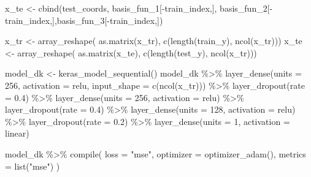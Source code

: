 \documentclass[
]{article}
\newenvironment{Shaded}{\begin{snugshade}}{\end{snugshade}}
\newcommand{\AttributeTok}[1]{\textcolor[rgb]{0.77,0.63,0.00}{#1}}
\newcommand{\DecValTok}[1]{\textcolor[rgb]{0.00,0.00,0.81}{#1}}
\newcommand{\FloatTok}[1]{\textcolor[rgb]{0.00,0.00,0.81}{#1}}
\newcommand{\FunctionTok}[1]{\textcolor[rgb]{0.00,0.00,0.00}{#1}}
\newcommand{\NormalTok}[1]{#1}
\newcommand{\OtherTok}[1]{\textcolor[rgb]{0.56,0.35,0.01}{#1}}
\newcommand{\SpecialCharTok}[1]{\textcolor[rgb]{0.00,0.00,0.00}{#1}}
\newcommand{\StringTok}[1]{\textcolor[rgb]{0.31,0.60,0.02}{#1}}
\begin{document}
\begin{Shaded}
\begin{Highlighting}[]
\NormalTok{  x\_te }\OtherTok{\textless{}{-}} \FunctionTok{cbind}\NormalTok{(test\_coords, basis\_fun\_1[}\SpecialCharTok{{-}}\NormalTok{train\_index,],}
\NormalTok{                basis\_fun\_2[}\SpecialCharTok{{-}}\NormalTok{train\_index,],basis\_fun\_3[}\SpecialCharTok{{-}}\NormalTok{train\_index,]) }
  
  
\NormalTok{  x\_tr }\OtherTok{\textless{}{-}} \FunctionTok{array\_reshape}\NormalTok{( }\FunctionTok{as.matrix}\NormalTok{(x\_tr), }\FunctionTok{c}\NormalTok{(}\FunctionTok{length}\NormalTok{(train\_y), }\FunctionTok{ncol}\NormalTok{(x\_tr)))}
\NormalTok{  x\_te }\OtherTok{\textless{}{-}} \FunctionTok{array\_reshape}\NormalTok{( }\FunctionTok{as.matrix}\NormalTok{(x\_te), }\FunctionTok{c}\NormalTok{(}\FunctionTok{length}\NormalTok{(test\_y), }\FunctionTok{ncol}\NormalTok{(x\_tr))) }
  
  
  
\NormalTok{model\_dk }\OtherTok{\textless{}{-}} \FunctionTok{keras\_model\_sequential}\NormalTok{()}
\NormalTok{model\_dk }\SpecialCharTok{\%\textgreater{}\%} 
  \FunctionTok{layer\_dense}\NormalTok{(}\AttributeTok{units =} \DecValTok{256}\NormalTok{, }\AttributeTok{activation =} \StringTok{\textquotesingle{}relu\textquotesingle{}}\NormalTok{, }\AttributeTok{input\_shape =} \FunctionTok{c}\NormalTok{(}\FunctionTok{ncol}\NormalTok{(x\_tr))) }\SpecialCharTok{\%\textgreater{}\%} 
  \FunctionTok{layer\_dropout}\NormalTok{(}\AttributeTok{rate =} \FloatTok{0.4}\NormalTok{) }\SpecialCharTok{\%\textgreater{}\%} 
  \FunctionTok{layer\_dense}\NormalTok{(}\AttributeTok{units =} \DecValTok{256}\NormalTok{, }\AttributeTok{activation =} \StringTok{\textquotesingle{}relu\textquotesingle{}}\NormalTok{) }\SpecialCharTok{\%\textgreater{}\%} 
  \FunctionTok{layer\_dropout}\NormalTok{(}\AttributeTok{rate =} \FloatTok{0.4}\NormalTok{) }\SpecialCharTok{\%\textgreater{}\%}
  \FunctionTok{layer\_dense}\NormalTok{(}\AttributeTok{units =} \DecValTok{128}\NormalTok{, }\AttributeTok{activation =} \StringTok{\textquotesingle{}relu\textquotesingle{}}\NormalTok{) }\SpecialCharTok{\%\textgreater{}\%}
  \FunctionTok{layer\_dropout}\NormalTok{(}\AttributeTok{rate =} \FloatTok{0.2}\NormalTok{) }\SpecialCharTok{\%\textgreater{}\%}
  \FunctionTok{layer\_dense}\NormalTok{(}\AttributeTok{units =} \DecValTok{1}\NormalTok{, }\AttributeTok{activation =} \StringTok{\textquotesingle{}linear\textquotesingle{}}\NormalTok{)}

\NormalTok{model\_dk }\SpecialCharTok{\%\textgreater{}\%} \FunctionTok{compile}\NormalTok{(}
  \AttributeTok{loss =} \StringTok{"mse"}\NormalTok{,}
  \AttributeTok{optimizer =} \FunctionTok{optimizer\_adam}\NormalTok{(),}
  \AttributeTok{metrics =} \FunctionTok{list}\NormalTok{(}\StringTok{"mse"}\NormalTok{)}
\NormalTok{)}


\end{Highlighting}
\end{Shaded}
\end{document}
